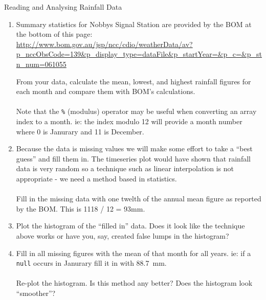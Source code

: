 \documentclass{lab}
\begin{document}
\begin{task}{Reading and Analysing Rainfall Data}{}
\begin{enumerate}
\begin{lstlisting}
plt.hist(rainfall)
plt.show()
\end{lstlisting}

\item Summary statistics for Nobbys Signal Station are provided by the BOM at the bottom of this page: \url{http://www.bom.gov.au/jsp/ncc/cdio/weatherData/av?p_nccObsCode=139&p_display_type=dataFile&p_startYear=&p_c=&p_stn_num=061055}

From your data, calculate the mean, lowest, and highest rainfall figures for each month and compare them with BOM's calculations.
\\~\\
Note that the \texttt{\%} (modulus) operator may be useful when converting an array index to a month. ie: the index modulo 12 will provide a month number where 0 is Janurary and 11 is December.

\item Because the data is missing values we will make some effort to take a ``best guess'' and fill them in. The timeseries plot would have shown that rainfall data is very random so a technique such as linear interpolation is not appropriate - we need a method based in statistics.
\\~\\
Fill in the missing data with one twelth of the annual mean figure as reported by the BOM. This is 1118 / 12 = 93mm.

\item Plot the histogram of the ``filled in'' data. Does it look like the technique above works or have you, say, created false lumps in the histogram?

\item Fill in all missing figures with the mean of that month for all years. ie: if a \texttt{null} occurs in Janurary fill it in with 88.7~mm.
\\~\\
Re-plot the histogram. Is this method any better? Does the histogram look ``smoother''?

\end{enumerate}
\end{task}
\end{document}
